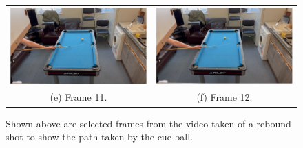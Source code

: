 \documentclass[ %
                author={Finn Alexander Wilkinson},
                supervisor={Dr. Andrew Calway},
                degree={MEng},
                title={\centering A Mixed Reality Aim Assistant for Pool and Snooker},
                subtitle={},
                type={Enterprise},
                year={2021} ]{dissertation}
\begin{document}
\begin{figure}[h!]
\begin{tabular}{cc}
         \includegraphics[scale = 0.15]{Images/Eval/Path Estimate/Rebound 2 Slow/Frame 11 - Shot 2 - Rebound 11.PNG} & \includegraphics[scale = 0.15]{Images/Eval/Path Estimate/Rebound 2 Slow/Frame 12 - Shot 2 - Rebound 12.PNG}\\
         (e) Frame 11. & (f) Frame 12.\\
    \end{tabular}
    \caption{Shown above are selected frames from the video taken of a rebound shot to show the path taken by the cue ball.}
    \label{fig:evalReboundShot}
\end{figure}
 
\newpage
\end{document}
